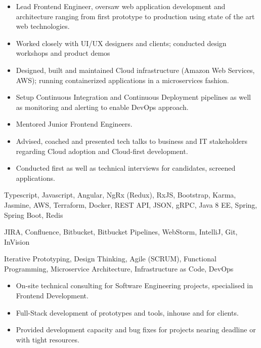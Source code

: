 
\medskip
\begin{itemize}
	\item Lead Frontend Engineer, oversaw web application development and architecture ranging from first prototype to production using state of the art web technologies.
	\item Worked closely with UI/UX designers and clients; conducted design workshops and product demos
	\item Designed, built and maintained Cloud infrastructure (Amazon Web Services, AWS); running containerized applications in a microservices fashion.
	\item Setup Continuous Integration and Continuous Deployment pipelines as well as monitoring and alerting to enable DevOps approach.
	\item Mentored Junior Frontend Engineers.
	\item Advised, coached and presented tech talks to business and IT stakeholders regarding Cloud adoption and Cloud-first development.
	\item Conducted first as well as technical interviews for candidates, screened applications.
\end{itemize}

\medskip
\begin{description}
	\ifincludestech
	\item [Technologies] Typescript, Javascript, Angular, NgRx (Redux), RxJS, Bootstrap, Karma, Jasmine, AWS, Terraform, Docker, REST API, JSON, gRPC, Java 8 EE, Spring, Spring Boot, Redis
	\fi
	\ifincludestools
	\item [Tools] JIRA, Confluence, Bitbucket, Bitbucket Pipelines, WebStorm, IntelliJ, Git, InVision
	\fi
	\ifincludesmethods
	\item [Methodologies] Iterative Prototyping, Design Thinking, Agile (SCRUM), Functional Programming, Microservice Architecture, Infrastructure as Code, DevOps
	\fi
\end{description}

\divider


\medskip
\begin{itemize}
	\item On-site technical consulting for Software Engineering projects, specialised in Frontend Development.
	\item Full-Stack development of prototypes and tools, inhouse and for clients.
	\item Provided development capacity and bug fixes for projects nearing deadline or with tight resources.
\end{itemize}

